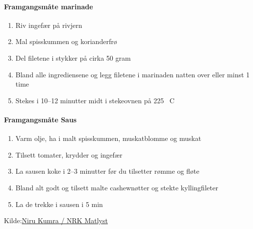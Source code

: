 \paragraph{Framgangsmåte marinade}
\begin{enumerate}[noitemsep]
  \item Riv ingefær på rivjern %
  \item Mal spisskummen og korianderfrø
  \item Del filetene i stykker på cirka 50 gram
  \item Bland alle ingrediensene og legg filetene i marinaden natten over eller minst 1 time
  \item Stekes i 10--12 minutter midt i stekeovnen på 225 \degree~C
\end{enumerate}

\paragraph{Framgangsmåte Saus}
\begin{enumerate}[noitemsep]
  \item Varm olje, ha i malt spisskummen, muskatblomme og muskat
  \item Tilsett tomater, krydder og ingefær
  \item La sausen koke i 2--3 minutter før du tilsetter rømme og fløte
  \item Bland alt godt og tilsett malte cashewnøtter og stekte kyllingfileter
  \item La de trekke i sausen i 5 min
\end{enumerate}


Kilde:\href{https://www.nrk.no/mat/nirus-chicken-tikka-masala-1.7314334}{Niru Kumra / NRK Matlyst}
